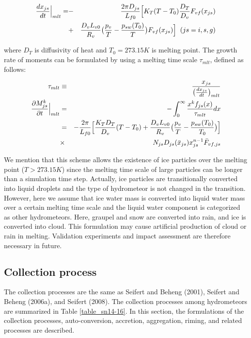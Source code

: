 \begin{eqnarray}
\frac{dx_{js}}{dt}\Bigr|_{mlt}=&-&\frac{2\pi D_{js}}{L_{f0}}\Bigl[K_{T}(T-T_{0})\frac{D_{T}}{D_{v}}F_{vf}(x_{js})\nonumber\\
&+&\frac{D_{v}L_{v0}}{R_{v}}\bigr(\frac{p_{v}}{T}-\frac{p_{sw}(T_{0})}{T}\bigr)F_{vf}(x_{js})\Bigr]\;\;(js=i,s,g)\label{sn128}
\end{eqnarray}

where $D_{T}$ is diffusivity of heat and $T_{0} = 273.15 K$ is melting point. The growth rate of moments can be formulated by using a melting time scale $\tau_{mlt}$, defined as follows:

\begin{eqnarray}
\tau_{mlt}&\equiv&\frac{x_{js}}{\bigl(\frac{dx_{js}}{dt}\bigr)_{mlt}}\label{sn129}\\
\frac{\partial M_{js}^{k}}{\partial t}\Bigr|_{mlt}&=&-\int_{0}^{\infty}\frac{x^{k}f_{js}(x)}{\tau_{mlt}}dx\nonumber\\
&=&-\frac{2\pi}{L_{f0}}\Bigl[\frac{K_{T}D_{T}}{D_{v}}(T-T_{0})+\frac{D_{v}L_{v0}}{R_{v}}\bigl(\frac{p_{v}}{T}-\frac{p_{sw}(T_{0})}{T_{0}}\bigr)\Bigr]\nonumber\\
&\times& N_{js}D_{js}(\bar{x}_{js})x_{js}^{n-1}\bar{F}_{vf,js}
\label{sn140}
\end{eqnarray}

We mention that this scheme allows the existence of ice particles over the melting point ($T>273.15 K$) since the melting time scale of large particles can be longer than a simulation time step. Actually, ice particles are transitionally converted into liquid droplets and the type of hydrometeor is not changed in the transition. However, here we assume that ice water mass is converted into liquid water mass over a certain melting time scale and the liquid water component is categorized as other hydrometeors. Here, graupel and snow are converted into rain, and ice is converted into cloud. This formulation may cause artificial production of cloud or rain in melting. Validation experiments and impact assessment are therefore necessary in future.

\subsection{Collection process}
The collection processes are the same as Seifert and Beheng (2001), Seifert and Beheng (2006a), and Seifert (2008). The collection processes among hydrometeors are summarized in Table \ref{table_sn14-16}. In this section, the formulations of the collection processes, auto-conversion, accretion, aggregation, riming, and related processes are described.


